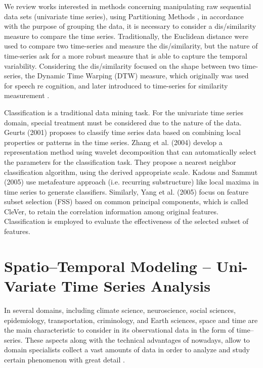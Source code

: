 We review works interested in methods concerning manipulating raw sequential data sets (univariate time series), using Partitioning Methods \cite{}, in accordance with the purpose of grouping the data, it is necessary to consider a dis/similarity measure to compare the time series. Traditionally, the Euclidean distance were used to compare two time-series and measure the dis/similarity, but the nature of time-series ask for a more robust measure that is able to capture the temporal variability. Considering the dis/similarity focused on the shape between two time-series, the Dynamic Time Warping (DTW) measure, which originally was used for speech re cognition, and later introduced to time-series for similarity measurement \cite{}.


Classification is a traditional data mining task. For the univariate time series domain, special treatment must be considered due to the nature of the data. Geurts (2001) proposes to classify time series data based on combining local properties or patterns in the time series. Zhang et al. (2004) develop a representation method using wavelet decomposition that can automatically select the parameters for the classification task. They propose a nearest neighbor classification algorithm, using the derived appropriate scale. Kadous and Sammut (2005) use metafeature approach (i.e. recurring substructure) like local maxima in time series to generate classifiers. Similarly, Yang et al. (2005) focus on feature subset selection (FSS) based on common principal components, which is called CleVer, to retain the correlation information among original features. Classification is employed to evaluate the effectiveness of the selected subset of features. 

\section{Spatio--Temporal Modeling -- Uni-Variate Time Series Analysis}
\label{Sec:STModeling}

In several domains, including climate science, neuroscience, social sciences, epidemiology, transportation, criminology, and Earth sciences, space and time are the main characteristic to consider in its observational data in the form of time--series. These aspects along with the technical advantages of nowadays, allow to domain specialists collect a vast amounts of data in order to analyze and study certain phenomenon with great detail \cite{}. 


